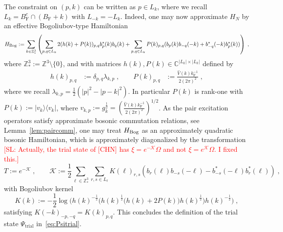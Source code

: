 \documentclass[12pt,a4paper]{article}
\numberwithin{equation}{section}
\newcommand{\cK}{\mathcal{K}}
\newcommand{\CCC}{\mathbb{C}}
\newcommand{\ZZZ}{\mathbb{Z}}
\newcommand{\1}{\mathbb{I}}
\newcommand{\Bog}{\textnormal{Bog}}
\newcommand{\F}{\mathrm{F}}
\newcommand{\trial}{\mathrm{trial}}
\theoremstyle{plain}
\theoremstyle{definition}
\theoremstyle{remark}
\theoremstyle{plain}
\theoremstyle{definition}
\theoremstyle{remark}
\begin{document}
The constraint on $ (p,k) $ can be written as $ p \in L_k $, where we recall $ L_k = B_{\F}^c \cap (B_{\F} + k) $ with $ L_{-k} = - L_k $. Indeed, one may now approximate $ H_N $ by an effective Bogoliubov-type Hamiltonian~\cite[(1.34)]{CHN23} 
\begin{equation} \label{eq:HBog}
	H_{\Bog}
	:= \sum_{k \in \ZZZ^3_*} \left( \sum_{p,q \in L_k} 2 (h(k) + P(k))_{p,q} b^*_p(k) b_q(k)
		+ \sum_{p,q \in L_k} P(k)_{p,q} (b_p(k) b_{-q}(-k) + b^*_{-q}(-k) b^*_p(k)) \right) \;,
\end{equation}
where $ \ZZZ^3_* := \ZZZ^3 \setminus \{0\} $, and with matrices $ h(k), P(k) \in \CCC^{|L_k| \times |L_k|} $ defined by
\begin{equation} \label{eq:HkPk}
\begin{aligned}
	h(k)_{p,q} &:= \delta_{p,q} \lambda_{k,p} \;, \qquad
	P(k)_{p,q} &:= \frac{\hat{V}(k) k_{\F}^{-1}}{2 (2 \pi)^2} \;,
\end{aligned}
\end{equation}
where we recall $ \lambda_{k,p} = \frac 12 (|p|^2 - |p-k|^2) $. In particular $ P(k) $ is rank-one with $ P(k) := |v_k \rangle \langle v_k | $, where $ v_{k,p} := g_k^{\frac 12} = \left( \frac{\hat{V}(k) k_{\F}^{-1}}{2 (2 \pi)^2} \right)^{1/2}  $. As the pair excitation operators satisfy approximate bosonic commutation relations, see Lemma~\ref{lem:paircomm}, one may treat $ H_{\Bog} $ as an approximately quadratic bosonic Hamiltonian, which is approximately diagonalized by the transformation~\cite[Thm.~1.4]{CHN23} \textcolor{red}{[SL: Actually, the trial state of [CHN] has $ \xi = e^{-\cK} \Omega $ and not $ \xi = e^{\cK} \Omega $. I fixed this.]}
\begin{equation} \label{eq:T}
	T := e^{-\cK} \;, \qquad
	\cK := \frac{1}{2}\sum\limits_{\ell\in \mathbb{Z}^3_*}\sum\limits_{r,s\in L_\ell}K(\ell)_{r,s}\left(b_r(\ell)b_{-s}(-\ell)-b^*_{-s}(-\ell)b^*_{r}(\ell)\right) \;,
\end{equation}
with Bogoliubov kernel
\begin{equation} \label{eq:K}
	K(k) := - \frac 12 \log \Big( h(k)^{-\frac 12} \big( h(k)^{\frac 12} \big( h(k) + 2 P(k) \big) h(k)^{\frac 12}\big) h(k)^{-\frac 12} \Big) \;,
\end{equation}
satisfying $ K(-k)_{-p,-q} = K(k)_{p,q} $. This concludes the definition of the trial state $ \Psi_{\trial} $ in~\eqref{eq:Psitrial}.
\end{document}
